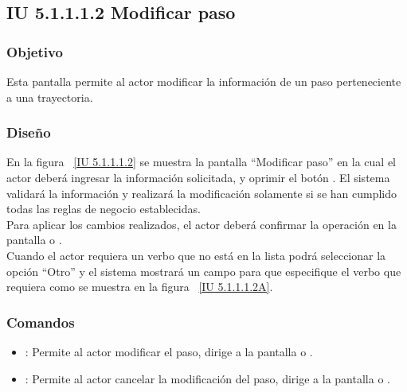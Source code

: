 \newpage 
\subsection{IU 5.1.1.1.2 Modificar paso}

\subsubsection{Objetivo}
	
	Esta pantalla permite al actor modificar la información de un paso perteneciente a una trayectoria.

\subsubsection{Diseño}

    En la figura ~\ref{IU 5.1.1.1.2} se muestra la pantalla ``Modificar paso'' en la cual el actor deberá ingresar la información solicitada, y oprimir el botón . El sistema validará la información y realizará la modificación solamente si se han cumplido todas las reglas de negocio establecidas.\\
	
	Para aplicar los cambios realizados, el actor deberá confirmar la operación en la pantalla  o .\\
    
    Cuando el actor requiera un verbo que no está en la lista podrá seleccionar la opción ``Otro'' y el sistema mostrará un campo para que especifique el verbo que requiera como se muestra en la figura ~\ref{IU 5.1.1.1.2A}. \\
    




\subsubsection{Comandos}
\begin{itemize}
	\item {}: Permite al actor modificar el paso, dirige a la pantalla  o .
	\item {}: Permite al actor cancelar la modificación del paso, dirige a la pantalla  o .
\end{itemize}

